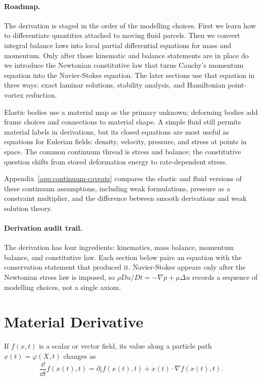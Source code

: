 \paragraph{Roadmap.}
The derivation is staged in the order of the modelling choices. First we learn
how to differentiate quantities attached to moving fluid parcels. Then we
convert integral balance laws into local partial differential equations for
mass and momentum. Only after those kinematic and balance statements are in
place do we introduce the Newtonian constitutive law that turns Cauchy's
momentum equation into the Navier-Stokes equation. The later sections use that
equation in three ways: exact laminar solutions, stability analysis, and
Hamiltonian point-vortex reduction.

Elastic bodies use a material map as the primary unknown; deforming bodies add
frame choices and connections to material shape. A simple fluid still permits
material labels in derivations, but its closed equations are most useful as
equations for Eulerian fields: density, velocity, pressure, and stress at
points in space. The common continuum thread is stress and balance; the
constitutive question shifts from stored deformation energy to rate-dependent
stress.

Appendix~\ref{app:continuum-caveats} compares the elastic and fluid versions of
these continuum assumptions, including weak formulations, pressure as a
constraint multiplier, and the difference between smooth derivations and weak
solution theory.

\paragraph{Derivation audit trail.}
The derivation has four ingredients: kinematics, mass balance, momentum
balance, and constitutive law. Each section below pairs an equation with the
conservation statement that produced it. Navier-Stokes appears only after the
Newtonian stress law is imposed, so
\(\rho Du/Dt=-\nabla p+\mu\Delta u\) records a sequence of modelling choices,
not a single axiom.

\section{Material Derivative}
\label{sec:material-derivative}

If \(f(x,t)\) is a scalar or vector field, its value along a particle path
\(x(t)=\varphi(X,t)\) changes as
\[
  \frac{\dd}{\dd t}f(x(t),t)
  =
  \partial_t f(x(t),t)+\dot x(t)\cdot\nabla f(x(t),t).
\]

